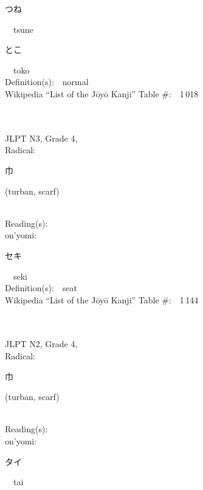 \begin{multicols}{2}
{\hspace*{2em}}{\begin{CJK}{UTF8}{min} つね \end{CJK}}\ \ tsune\ \ \\
{\hspace*{2em}}{\begin{CJK}{UTF8}{min} とこ \end{CJK}}\ \ toko\ \ \\
Definition(s):\ \ normal \\
Wikipedia ``List of the J\=oy\=o Kanji'' Table \#:\ \ 1\,018 \\
\ \ \\
{\fontsize{34pt}{40pt}  }\ \ \\  %
{JLPT N3, Grade 4, \\Radical:\ \ {\begin{CJK}{UTF8}{min} 巾 \end{CJK}} (turban, scarf) } \\
Reading(s):\ \ \\
{\hspace*{1em}}on'yomi:\ \ \\
{\hspace*{2em}}{\begin{CJK}{UTF8}{min} セキ \end{CJK}}\ \ seki\ \ \\
Definition(s):\ \ seat \\
Wikipedia ``List of the J\=oy\=o Kanji'' Table \#:\ \ 1\,144 \\
\ \ \\
{\fontsize{34pt}{40pt}  }\ \ \\  %
{JLPT N2, Grade 4, \\Radical:\ \ {\begin{CJK}{UTF8}{min} 巾 \end{CJK}} (turban, scarf) } \\
Reading(s):\ \ \\
{\hspace*{1em}}on'yomi:\ \ \\
{\hspace*{2em}}{\begin{CJK}{UTF8}{min} タイ \end{CJK}}\ \ tai\ \ \\

\end{multicols}
